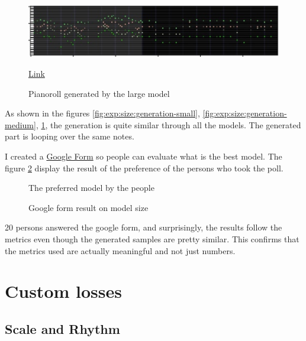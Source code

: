\documentclass[12pt]{report}
\begin{document}
\begin{figure}[htbp]
    \centering
    \includegraphics[width=\textwidth]{images/experiences/size/generation-comparison-size-large.jpg}
    \caption{Pianoroll generated by the large model}
    \href{https://github.com/ValentinVignal/midiGenerator/blob/master/samples/mode-size-comparison/large.mid}{Link}
    \label{fig:exp:size:generation-large}
\end{figure}

As shown in the figures \ref{fig:exp:size:generation-small}, \ref{fig:exp:size:generation-medium}, \ref{fig:exp:size:generation-large}, the generation is quite similar through all the models.
The generated part is looping over the same notes.


I created a \href{https://docs.google.com/forms/d/e/1FAIpQLSdBn0DZZe-8YPvLYl-vovapk1iMnteeLzGfFJ7R00D3eA-Ydw/viewform?usp=sf_link}{Google Form} so people can evaluate what is the best model.
The figure \ref{fig:pie:size} display the result of the preference of the persons who took the poll.

\begin{figure}
    \begin{center}
    \caption{Google form result on model size}
    The preferred model by the people
    \label{fig:pie:size}
    \end{center}
\end{figure}

20 persons answered the google form, and surprisingly, the results follow the metrics even though the generated samples are pretty similar.
This confirms that the metrics used are actually meaningful and not just numbers.

\section{Custom losses}

\subsection{Scale and Rhythm}
\end{document}
